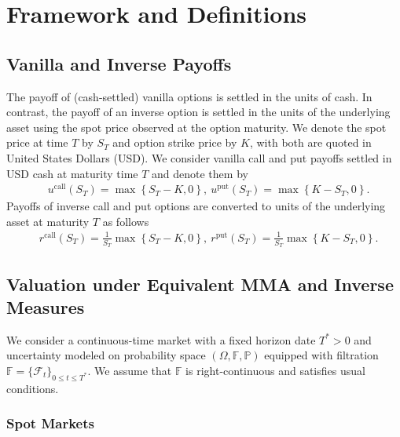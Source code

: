 \documentclass[pdftex,11pt,a4paper] {article}
\begin{document}
\section{Framework and Definitions}\label{sec:setup}


\subsection{Vanilla and Inverse Payoffs} \label{sec:der}

The payoff of (cash-settled) vanilla options is settled in the units of cash. In contrast, the payoff of an inverse option is settled in the units of the underlying asset using the spot price observed at the option maturity. We denote the spot price at time $T$ by $S_T$ and option strike price by $K$, with both are quoted in United States Dollars (USD). We consider vanilla call and put payoffs settled in USD cash at maturity time $T$ and denote them by
\begin{equation}\label{eq:call_put_vanilla}
\begin{split}
& u^{\text{call}}(S_{T}) = \max\left\{ S_{T} -K, 0\right\}, \  u^{\text{put}}(S_{T}) = \max\left\{ K-S_{T}, 0\right\}.
\end{split}
\end{equation}
Payoffs of inverse call and put options are converted to units of the underlying asset at maturity $T$ as follows
\begin{equation}\label{eq:call_put_inverse}
\begin{split}
& r^{\text{call}}(S_{T}) =  \frac{1}{S_{T}}\max\left\{ S_{T} -K, 0\right\} , \  r^{\text{put}}(S_{T}) =  \frac{1}{S_{T}}\max\left\{ K-S_{T}, 0\right\}.
\end{split}
\end{equation}


\subsection{Valuation under Equivalent MMA and Inverse Measures}

We consider a continuous-time market with a fixed horizon date $T^{*}>0$ and uncertainty modeled on probability space $(\Omega, \mathbb{F}, \mathbb{P})$ equipped with filtration $\mathbb{F}=\{\mathcal{F}_t\}_{0\le t\le T^*}$. We assume that $\mathbb{F}$  is right-continuous and satisfies usual conditions. 


\subsubsection{Spot Markets}
\end{document}
